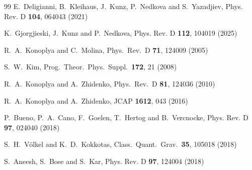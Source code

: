 \documentclass[11pt,a4paper]{article}
\begin{document}
\begin{thebibliography}{99}
E.~Deligianni, B.~Kleihaus, J.~Kunz, P.~Nedkova and S.~Yazadjiev,
Phys. Rev. D \textbf{104},  064043 (2021)

K.~Gjorgjieski, J.~Kunz and P.~Nedkova,
Phys. Rev. D \textbf{112}, 104019 (2025)



  R.~A.~Konoplya and C.~Molina,
  Phys.\ Rev.\ D {\bf 71}, 124009 (2005)

  S.~W.~Kim,
  Prog.\ Theor.\ Phys.\ Suppl.\  {\bf 172}, 21 (2008)

  R.~A.~Konoplya and A.~Zhidenko,
  Phys.\ Rev.\ D {\bf 81}, 124036 (2010)

  R.~A.~Konoplya and A.~Zhidenko,
  JCAP {\bf 1612}, 043 (2016)

P.~Bueno, P.~A.~Cano, F.~Goelen, T.~Hertog and B.~Vercnocke,
Phys. Rev. D \textbf{97}, 024040 (2018)
  
  S.~H.~V\"olkel and K.~D.~Kokkotas,
  Class.\ Quant.\ Grav.\  {\bf 35}, 105018 (2018)

S.~Aneesh, S.~Bose and S.~Kar,
Phys. Rev. D \textbf{97}, 124004 (2018)


\end{thebibliography}
\end{document}
